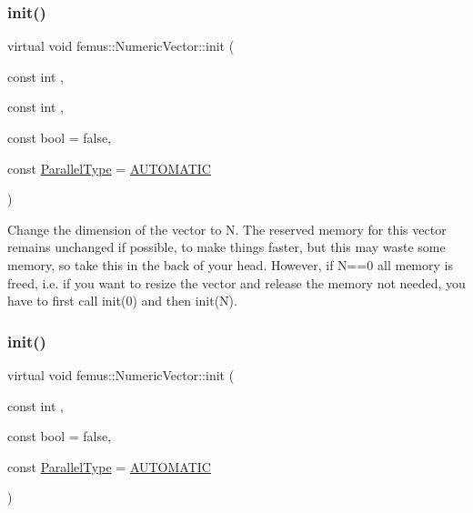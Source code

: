 \subsubsection{\texorpdfstring{init()}{init()}\hspace{0.1cm}{\footnotesize\ttfamily [1/4]}}
{\footnotesize\ttfamily virtual void femus\+::\+Numeric\+Vector\+::init (\begin{DoxyParamCaption}\item[{const int}]{,  }\item[{const int}]{,  }\item[{const bool}]{ = {\ttfamily false},  }\item[{const \mbox{\hyperlink{_paralleltype_enum_8hpp_a55f694af2ca20b6481914237cf7e567c}{Parallel\+Type}}}]{ = {\ttfamily \mbox{\hyperlink{_paralleltype_enum_8hpp_a55f694af2ca20b6481914237cf7e567ca0a831c2bc18e8354fe3e30ec0f3cdcda}{A\+U\+T\+O\+M\+A\+T\+IC}}} }\end{DoxyParamCaption})\hspace{0.3cm}{\ttfamily [pure virtual]}}

Change the dimension of the vector to {\ttfamily N}. The reserved memory for this vector remains unchanged if possible, to make things faster, but this may waste some memory, so take this in the back of your head. However, if {\ttfamily N==0} all memory is freed, i.\+e. if you want to resize the vector and release the memory not needed, you have to first call {\ttfamily init(0)} and then {\ttfamily init(\+N)}. \mbox{\label{classfemus_1_1_numeric_vector_a25073e01fdd83a8eddf1e6c13ebc668c}} 
\subsubsection{\texorpdfstring{init()}{init()}\hspace{0.1cm}{\footnotesize\ttfamily [2/4]}}
{\footnotesize\ttfamily virtual void femus\+::\+Numeric\+Vector\+::init (\begin{DoxyParamCaption}\item[{const int}]{,  }\item[{const bool}]{ = {\ttfamily false},  }\item[{const \mbox{\hyperlink{_paralleltype_enum_8hpp_a55f694af2ca20b6481914237cf7e567c}{Parallel\+Type}}}]{ = {\ttfamily \mbox{\hyperlink{_paralleltype_enum_8hpp_a55f694af2ca20b6481914237cf7e567ca0a831c2bc18e8354fe3e30ec0f3cdcda}{A\+U\+T\+O\+M\+A\+T\+IC}}} }\end{DoxyParamCaption})\hspace{0.3cm}{\ttfamily [pure virtual]}}

